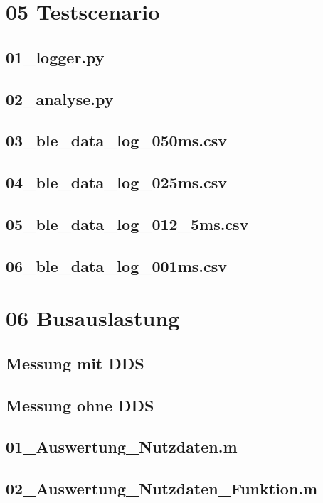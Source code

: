 \newpage 

\section{05 Testscenario}
\label{app:Odner6}
\subsection{01\_logger.py}
\label{app:File61_lg}
\subsection{02\_analyse.py}
\label{app:File62_an}
\subsection{03\_ble\_data\_log\_050ms.csv}
\label{app:File63_50ms}
\subsection{04\_ble\_data\_log\_025ms.csv}
\label{app:File64_25ms}
\subsection{05\_ble\_data\_log\_012\_5ms.csv}
\label{app:File65_12_5ms}
\subsection{06\_ble\_data\_log\_001ms.csv}
\label{app:File66_1ms}


\section{06 Busauslastung}
\label{app:Odner7}
\subsection{Messung mit DDS}
\label{app:Ordner71}
\subsection{Messung ohne DDS}
\label{app:Ordner72}
\subsection{01\_Auswertung\_Nutzdaten.m}
\label{app:File73}
\subsection{02\_Auswertung\_Nutzdaten\_Funktion.m}
\label{app:File74}